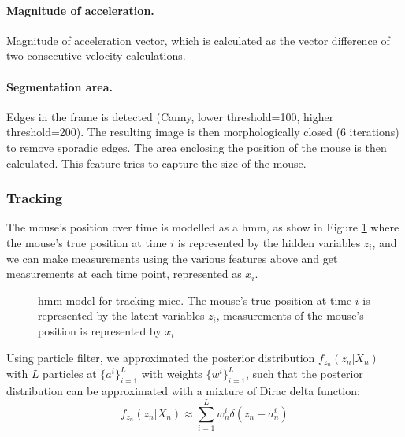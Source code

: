 \paragraph{Magnitude of acceleration.} Magnitude of acceleration vector, which is calculated as the vector difference of two consecutive velocity calculations. 

\paragraph{Segmentation area.} Edges in the frame is detected (Canny, lower threshold=100, higher threshold=200). The resulting image is then morphologically closed (6 iterations) to remove sporadic edges. The area enclosing the position of the mouse is then calculated. This feature tries to capture the size of the mouse.

\subsubsection{Tracking}

The mouse's position over time is modelled as a \gls{hmm}, as show in Figure \ref{f.ad.hmm} where the mouse's true position at time $i$ is represented by the hidden variables $z_i$, and we can make measurements using the various features above and get measurements at each time point, represented as $x_i$. 

\begin{figure}[h]
    
    \caption[\gls{hmm} model for tracking mice.]{\gls{hmm} model for tracking mice. The mouse's true position at time $i$ is represented by the latent variables $z_i$, measurements of the mouse's position is represented by $x_i$. \label{f.ad.hmm}}
\end{figure}

Using particle filter, we approximated the posterior distribution $f_{z_n}(z_n|X_n)$ with $L$ particles at $\{a^i\}_{i=1}^L$ with weights $\{w^i\}_{i=1}^L$, such that the posterior distribution can be approximated with a mixture of Dirac delta function: 
\begin{equation} \label{zn_approx}
    f_{z_n}(z_n|X_n) \approx \sum_{i=1}^Lw_n^i\delta(z_n - a_n^i)
\end{equation}

